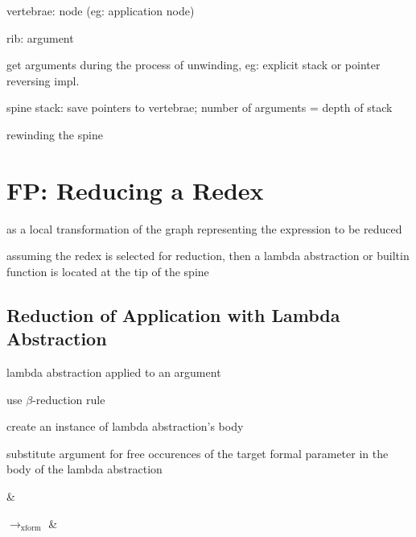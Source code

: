 \documentclass[8pt]{extarticle}
\begin{document}
\begin{multicols*}{2}
vertebrae: node (eg: application node)

rib: argument

get arguments during the process of unwinding, eg: explicit stack or pointer reversing impl.

spine stack: save pointers to vertebrae; number of arguments = depth of stack

rewinding the spine

\vfill\null
\columnbreak

\section{FP: Reducing a Redex}

as a local transformation of the graph representing the expression to be reduced

assuming the redex is selected for reduction, then a lambda abstraction or builtin function is located at the tip of the spine

\subsection{Reduction of Application with Lambda Abstraction}

lambda abstraction applied to an argument

use $\beta$-reduction rule

create an instance of lambda abstraction's body

substitute argument for free occurences of the target formal parameter in the body of the lambda abstraction


\begin{tblr}[]{}
 & 

$\rightarrow_{\text{xform}}$ &

\end{tblr}


\end{multicols*}
\end{document}
